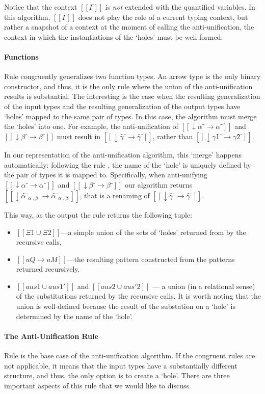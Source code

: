   Notice that the context $[[Γ]]$ is \emph{not} extended with 
  the quantified variables. In this algorithm, $[[Γ]]$ 
  does not play the role of a current typing context, but rather
  a snapshot of a context at the moment of calling the anti-unification,
  \ie the context in which the instantiations of the `holes' 
  must be well-formed.

\paragraph*{Functions}
  Rule  congruently generalizes two function types. 
  An arrow type is the only binary constructor, 
  and thus, it is the only rule where the union of the anti-unification results is substantial.
  The interesting is the case when the resulting generalization of the 
  input types and the resulting generalization of the output types 
  have `holes' mapped to the same pair of types. 
  In this case, the algorithm must merge the `holes' into one.
  For example, the anti-unification of 
  $[[↓α⁻ → α⁻]]$ and $[[↓β⁻ → β⁻]]$
  must result in $[[↓γ̂⁻ → γ̂⁻]]$,
  rather than $[[↓γ1̂⁻ → γ2̂⁻]]$.

  In our representation of the anti-unification algorithm, this `merge' happens
  automatically:
  following the rule ,
  the name of the `hole' is uniquely defined by the pair of types it is mapped to.  
  Specifically, when anti-unifying $[[↓α⁻ → α⁻]]$ and $[[↓β⁻ → β⁻]]$ our algorithm returns 
  $[[↓α̂⁻_{α⁻, β⁻} → α̂⁻_{α⁻, β⁻}]]$, that is a renaming of $[[↓γ̂⁻ → γ̂⁻]]$.

  This way, as the output the rule returns the following tuple:
  \begin{itemize}
    \item $[[Ξ1 ∪ Ξ2]]$---a simple union of the sets of `holes' 
      returned from by the recursive calls, 
    \item $[[uQ → uM]]$---the resulting pattern 
      constructed from the patterns returned recursively.
    \item $[[aus1 ∪ aus1']]$ and $[[aus2 ∪ aus'2]]$
      --- a union (in a relational sense)
      of the substitutions returned by the recursive calls. 
      It is worth noting that the union is well-defined because
      the result of the substation on a `hole' is determined by the 
      name of the `hole'.
  \end{itemize}

\paragraph*{The Anti-Unification Rule}
  Rule  is the base case of the anti-unification
  algorithm. If the congruent rules are not applicable, 
  it means that the input types have a substantially different structure,
  and thus, the only option is to create a `hole'. 
  There are three important aspects of this rule that we would like to discuss.

